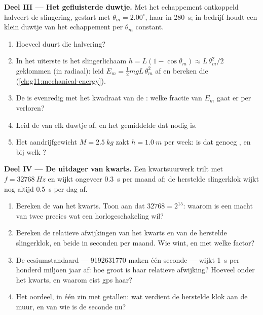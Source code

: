 \begin{problem}
\medskip
\noindent\textbf{Deel III --- Het gefluisterde duwtje.} Met het echappement
ontkoppeld halveert de slingering, gestart met 
$\theta_m = 2.00^\circ$, haar  in \qty{280}{s}; in bedrijf houdt een
klein duwtje van het echappement per  $\theta_m$ constant.
\begin{enumerate}[resume]
  \item Hoeveel  duurt die halvering?
  \item In het uiterste is het slingerlichaam $h = L(1 - \cos\theta_m)
        \approx L\,\theta_m^2/2$ geklommen (in radiaal): leid
        $E_m = \tfrac12 m g L\,\theta_m^2$ af en bereken die
        (\cref{ch:g11:mechanical-energy}).
  \item De  is evenredig met het kwadraat van de : welke
        fractie van $E_m$ gaat er per  verloren?
  \item Leid de  van elk duwtje af, en het gemiddelde  dat
        nodig is.
  \item Het aandrijfgewicht $M = \qty{2.5}{kg}$ zakt $h = \qty{1.0}{m}$ per
        week: is dat genoeg , en bij welk ?
\end{enumerate}

\medskip
\noindent\textbf{Deel IV --- De uitdager van kwarts.} Een kwartsuurwerk trilt
met $f = \qty{32768}{Hz}$ en wijkt ongeveer \qty{0.3}{s} per maand af; de
herstelde slingerklok wijkt nog altijd \qty{0.5}{s} per dag af.
\begin{enumerate}[resume]
  \item Bereken de  van het kwarts. Toon aan dat $\num{32768} = 2^{15}$:
        waarom is een macht van twee precies wat een horlogeschakeling wil?
  \item Bereken de relatieve afwijkingen van het kwarts en van de herstelde
        slingerklok, en beide in seconden per maand. Wie wint, en met welke
        factor?
  \item De cesiumstandaard --- \num{9192631770}  maken één seconde ---
        wijkt \qty{1}{s} per honderd miljoen jaar af: hoe groot is haar
        relatieve afwijking? Hoeveel  onder het kwarts, en waarom
        eist gps haar?
  \item Het oordeel, in één zin met getallen: wat verdient de herstelde klok
        aan de muur, en van wie is de seconde nu?
\end{enumerate}
\end{problem}
